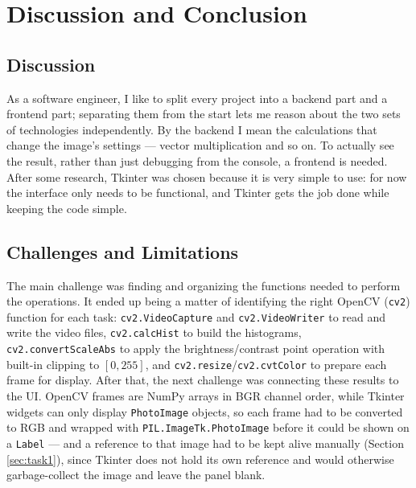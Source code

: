 \chapter{Discussion and Conclusion}
\label{ch:conclusion}


\section{Discussion}
\label{sec:discussion}


As a software engineer, I like to split every project into a backend part and a frontend part; separating them from the start lets me reason about the two sets of technologies independently. By the backend I mean the calculations that change the image's settings --- vector multiplication and so on. To actually see the result, rather than just debugging from the console, a frontend is needed. After some research, Tkinter was chosen because it is very simple to use: for now the interface only needs to be functional, and Tkinter gets the job done while keeping the code simple.


\section{Challenges and Limitations}
\label{sec:limitations}

The main challenge was finding and organizing the functions needed to perform the operations. It ended up being a matter of identifying the right OpenCV (\texttt{cv2}) function for each task: \texttt{cv2.VideoCapture} and \texttt{cv2.VideoWriter} to read and write the video files, \texttt{cv2.calcHist} to build the histograms, \texttt{cv2.convertScaleAbs} to apply the brightness/contrast point operation with built-in clipping to $[0,255]$, and \texttt{cv2.resize}/\texttt{cv2.cvtColor} to prepare each frame for display. After that, the next challenge was connecting these results to the UI. OpenCV frames are NumPy arrays in BGR channel order, while Tkinter widgets can only display \texttt{PhotoImage} objects, so each frame had to be converted to RGB and wrapped with \texttt{PIL.ImageTk.PhotoImage} before it could be shown on a \texttt{Label} --- and a reference to that image had to be kept alive manually (Section \ref{sec:task1}), since Tkinter does not hold its own reference and would otherwise garbage-collect the image and leave the panel blank.


